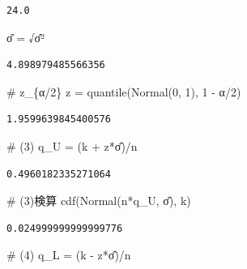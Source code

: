 \documentclass[
  letterpaper,
  DIV=11,
  numbers=noendperiod]{scrartcl}
\newenvironment{Shaded}{\begin{snugshade}}{\end{snugshade}}
\newcommand{\CommentTok}[1]{\textcolor[rgb]{0.37,0.37,0.37}{#1}}
\newcommand{\FloatTok}[1]{\textcolor[rgb]{0.68,0.00,0.00}{#1}}
\newcommand{\FunctionTok}[1]{\textcolor[rgb]{0.28,0.35,0.67}{#1}}
\newcommand{\NormalTok}[1]{\textcolor[rgb]{0.00,0.23,0.31}{#1}}
\newcommand{\OperatorTok}[1]{\textcolor[rgb]{0.37,0.37,0.37}{#1}}
\begin{document}
\begin{verbatim}
24.0
\end{verbatim}

\begin{Shaded}
\begin{Highlighting}[]
\NormalTok{σ̂ }\OperatorTok{=}\NormalTok{ √σ̂²}
\end{Highlighting}
\end{Shaded}

\begin{verbatim}
4.898979485566356
\end{verbatim}

\begin{Shaded}
\begin{Highlighting}[]
\CommentTok{\# z\_\{α/2\}}
\NormalTok{z }\OperatorTok{=} \FunctionTok{quantile}\NormalTok{(}\FunctionTok{Normal}\NormalTok{(}\FloatTok{0}\NormalTok{, }\FloatTok{1}\NormalTok{), }\FloatTok{1} \OperatorTok{{-}}\NormalTok{ α}\OperatorTok{/}\FloatTok{2}\NormalTok{)}
\end{Highlighting}
\end{Shaded}

\begin{verbatim}
1.9599639845400576
\end{verbatim}

\begin{Shaded}
\begin{Highlighting}[]
\CommentTok{\# (3)}
\NormalTok{q\_U }\OperatorTok{=}\NormalTok{ (k }\OperatorTok{+}\NormalTok{ z}\OperatorTok{*}\NormalTok{σ̂)}\OperatorTok{/}\NormalTok{n}
\end{Highlighting}
\end{Shaded}

\begin{verbatim}
0.4960182335271064
\end{verbatim}

\begin{Shaded}
\begin{Highlighting}[]
\CommentTok{\# (3)検算}
\FunctionTok{cdf}\NormalTok{(}\FunctionTok{Normal}\NormalTok{(n}\OperatorTok{*}\NormalTok{q\_U, σ̂), k)}
\end{Highlighting}
\end{Shaded}

\begin{verbatim}
0.024999999999999776
\end{verbatim}

\begin{Shaded}
\begin{Highlighting}[]
\CommentTok{\# (4)}
\NormalTok{q\_L }\OperatorTok{=}\NormalTok{ (k }\OperatorTok{{-}}\NormalTok{ z}\OperatorTok{*}\NormalTok{σ̂)}\OperatorTok{/}\NormalTok{n}
\end{Highlighting}
\end{Shaded}
\end{document}
